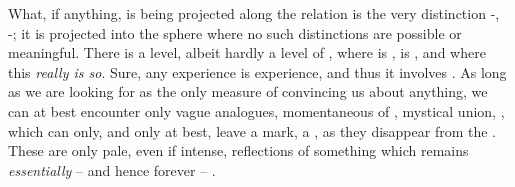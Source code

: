 What, if anything, is being {projected} along the  relation is the
very distinction -, -;
it is projected into the sphere where no such distinctions are possible or
meaningful.  There is a level, albeit hardly a level of , where
 is ,  is , and where this {\em really is so}.
Sure, any experience is  experience, and thus it involves .  As long as we are looking for  as the
only measure of convincing us about anything, we can at best encounter only
vague analogues, momentaneous  of , mystical union,
, which can only, and only at best, leave a mark, a
, as they disappear from the \hoa. These are only pale, even if
intense,  reflections of something which remains {\em essentially} --
and hence forever -- .   


